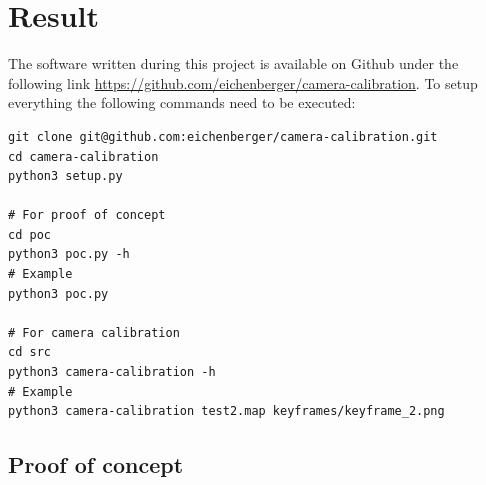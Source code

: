 \documentclass[11pt,a4paper,titlepage,oneside]{report}
\begin{document}
\chapter{Result}

The software written during this project is available on Github under the following link \url{https://github.com/eichenberger/camera-calibration}. To setup everything the following commands need to be executed:
\small
\lstset{language=bash}
\begin{lstlisting}
git clone git@github.com:eichenberger/camera-calibration.git
cd camera-calibration
python3 setup.py

# For proof of concept
cd poc
python3 poc.py -h
# Example
python3 poc.py

# For camera calibration
cd src
python3 camera-calibration -h
# Example
python3 camera-calibration test2.map keyframes/keyframe_2.png
\end{lstlisting}
\normalsize


\section{Proof of concept}
\end{document}
